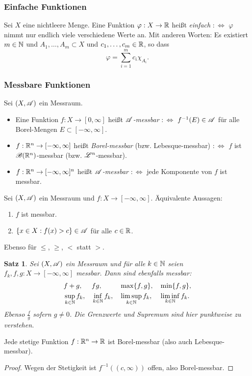 \documentclass[
 a4paper,
 12pt,
 parskip=half
 ]{scrartcl}
\theoremstyle{plain}
\newtheorem*{thm*}{Satz}
\theoremstyle{definition}
\numberwithin{equation}{section}
\begin{document}
\subsubsection{Einfache Funktionen}
Sei $X$ eine nichtleere Menge. Eine Funktion $\varphi: X \to \mathbb{R}$ heißt \emph{einfach} $:\Leftrightarrow$ $\varphi$ nimmt nur endlich viele verschiedene Werte an. Mit anderen Worten: Es existiert $m \in \mathbb{N}$ und $A_1, \ldots, A_m \subset X$ und $c_1, \ldots, c_m \in \mathbb{R}$, so dass
\[ \varphi = \sum_{i=1}^m c_i \chi_{A_i}. \]

\subsubsection{Messbare Funktionen}
Sei $(X, \mathscr{A})$ ein Messraum.
\begin{itemize}
 \item Eine Funktion $f: X \to [0, \infty]$ heißt \emph{$\mathscr{A}$-messbar} $:\Leftrightarrow$ $f^{-1}(E) \in \mathscr{A}$ für alle Borel-Mengen $E \subset [-\infty,\infty]$.
 \item $f: \mathbb{R}^n \to [-\infty,\infty]$ heißt \emph{Borel-messbar} (bzw. Lebesque-messbar) $:\Leftrightarrow$ $f$ ist $\mathscr{B}(\mathbb{R}^n)$-messbar (bzw. $\mathscr{L}^n$-messbar).
 \item $f: \mathbb{R}^n \to [-\infty,\infty]^n$ heißt \emph{$\mathscr{A}$-messbar} $:\Leftrightarrow$ jede Komponente von $f$ ist messbar.
\end{itemize}

\begin{bem}
 Sei $(X, \mathscr{A})$ ein Messraum und $f: X \to [-\infty,\infty]$. Äquivalente Aussagen:
 \begin{enumerate}
  \item $f$ ist messbar.
  \item $\{ x \in X: f(x) > c \} \in \mathscr{A}$ für alle $c \in \mathbb{R}$.
 \end{enumerate}
 Ebenso für $\le$, $\ge$, $<$ statt $>$.
\end{bem}

\begin{thm*}
 Sei $(X, \mathscr{A})$ ein Messraum und für alle $k \in \mathbb{N}$ seien $f_k, f, g: X \to [-\infty,\infty]$ messbar. Dann sind ebenfalls messbar:
 \begin{align*}
 &f+g,& &fg,& &\max\{ f, g \},& &\min\{ f, g \}, \\ 
 &\sup_{k \in \mathbb{N}} f_k, & &\inf_{k \in \mathbb{N}} f_k,& &\limsup_{k \in \mathbb{N}} f_k,& &\liminf_{k \in \mathbb{N}} f_k.
 \end{align*}
 Ebenso $\frac{f}{g}$ sofern $g \ne 0$. Die Grenzwerte und Supremum sind hier \emph{punktweise} zu verstehen.
\end{thm*}

\begin{bem}
 Jede stetige Funktion $f:\mathbb{R}^n \to \mathbb{R}$ ist Borel-messbar (also auch Lebesque-messbar).
\end{bem}

\begin{proof}
 Wegen der Stetigkeit ist $f^{-1}((c,\infty))$ offen, also Borel-messbar.
\end{proof}
\end{document}
